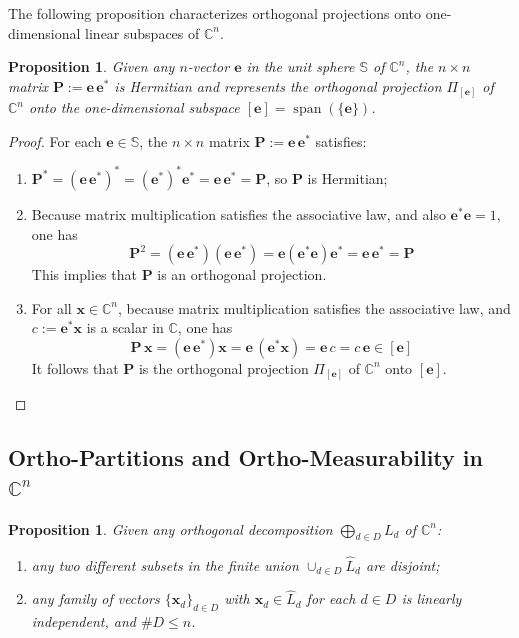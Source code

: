 \documentclass[11pt]{article}
\newcommand \C { \mathbb{C} }
\DeclareMathOperator{\spn}{{span}}
\newtheorem{proposition}[theorem]{Proposition}
\begin{document}
The following proposition characterizes orthogonal projections 
onto one-dimensional linear subspaces of $ \C^n $.
 
\begin{proposition} \label{prop:oneDimProj}
	Given any $n$-vector $ \mathbf e$ in the unit sphere $ \mathbb S$ of $ \C^n $,
	the $n \times n$ matrix $ \mathbf P := \mathbf e \, \mathbf e^* $ is Hermitian
	and represents the orthogonal projection $ \Pi _{[ \mathbf e] }$ of $ \C^n $
	onto the one-dimensional subspace $[ \mathbf e] = \spn ( \{ \mathbf e \} )$.
\end{proposition}

\begin{proof}
	For each $ \mathbf e \in \mathbb S$,
	the $n \times n$ matrix $\mathbf P := \mathbf e \, \mathbf e^* $ satisfies:
\begin{enumerate}
	\item \( \mathbf P^* = ( \mathbf e \, \mathbf e^* )^* = ( \mathbf e^* )^* \mathbf e^* 
	= \mathbf e \, \mathbf e^* = \mathbf P \), so $ \mathbf P$ is Hermitian;
	\item Because matrix multiplication satisfies the associative law,
	and also $ \mathbf e^* \mathbf e = 1$, one has
 \[ \mathbf P^2 = ( \mathbf e \, \mathbf e^* )( \mathbf e \, \mathbf e^* )
	= \mathbf e ( \mathbf e^* \mathbf e ) \mathbf e^* = \mathbf e \, \mathbf e^* = \mathbf P \]
	This implies that $ \mathbf P$ is an orthogonal projection. 
	\item For all $ \mathbf x \in \C^n $, 
	because matrix multiplication satisfies the associative law,
	and $c := \mathbf e^* \mathbf x$ is a scalar in $\C$, one has
\[ \mathbf P \, \mathbf x = ( \mathbf e \, \mathbf e^* ) \mathbf x 
	= \mathbf e \, ( \mathbf e^* \mathbf x) = \mathbf e \, c 
	= c \, \mathbf e \in [ \mathbf e] \]
	It follows that $ \mathbf P$ is the orthogonal projection $ \Pi _{[ \mathbf e] }$ 
	of $ \C^n $ onto $[ \mathbf e] $. \qedhere
\end{enumerate}
\end{proof}

\subsection{Ortho-Partitions and Ortho-Measurability in $ \C^n $} \label{ss:orthoMeas}

\begin{proposition}
	Given any orthogonal decomposition $ \bigoplus _{d \in D} L_d $ of $ \C^n $:
	\begin{enumerate}
		\item any two different subsets 
		in the finite union \( \cup _{d \in D} \hat L_d \) are disjoint;
 		\item any family of vectors $ \{ \mathbf x_d \}_{d \in D} $ 
		with $ \mathbf x_d \in \hat L_d $ for each $d \in D$ is linearly independent, 
		and $ \# D \le n$.
	\end{enumerate}
\end{proposition}
\end{document}
